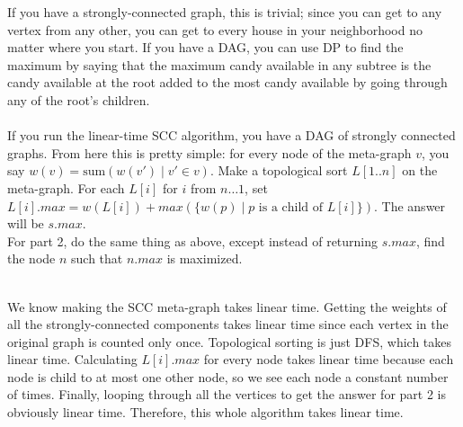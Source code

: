 \documentclass[11pt]{article}
\begin{document}
\begin{solution}
    If you have a strongly-connected graph, this is trivial; since you can get to any vertex from any other, you can get to every house in your neighborhood no matter where you start. If you have a DAG, you can use DP to find the maximum by saying that the maximum candy available in any subtree is the candy available at the root added to the most candy available by going through any of the root's children. 
    \\ \\ If you run the linear-time SCC algorithm, you have a DAG of strongly connected graphs. From here this is pretty simple: for every node of the meta-graph $v$, you say $w(v) = \text{sum}(w(v') \mid v' \in v)$. Make a topological sort $L[1..n]$ on the meta-graph. For each $L[i]$ for $i$ from $n\ldots 1$, set $L[i].max = w(L[i]) + max(\{w(p) \mid \text{$p$ is a child of $L[i]$}\})$. The answer will be $s.max$. 
    \\ For part 2, do the same thing as above, except instead of returning $s.max$, find the node $n$ such that $n.max$ is maximized.

    \\ We know making the SCC meta-graph takes linear time. Getting the weights of all the strongly-connected components takes linear time since each vertex in the original graph is counted only once. Topological sorting is just DFS, which takes linear time. Calculating $L[i].max$ for every node takes linear time because each node is child to at most one other node, so we see each node a constant number of times. Finally, looping through all the vertices to get the answer for part 2 is obviously linear time. Therefore, this whole algorithm takes linear time.
\end{solution}
\end{document}
